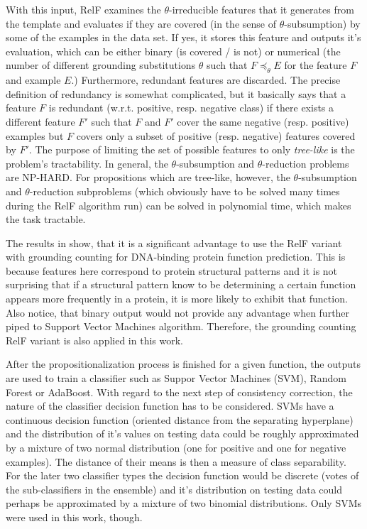 \documentclass[11pt,twoside,a4paper]{book}
\begin{document}
With this input, RelF examines the $\theta$-irreducible features that it generates from
the template and evaluates if they are covered (in the sense of $\theta$-subsumption)
by some of the examples in the data set.
If yes, it stores this feature and outputs it's evaluation,
which can be either binary (is covered / is not)
or numerical (the number of different grounding substitutions $\theta$ 
such that $F \preceq_{\theta} E$ for the feature $F$ and example $E$.)
Furthermore, redundant features are discarded.
The precise definition of redundancy \cite{relf} is somewhat complicated,
but it basically says that a feature $F$ is redundant (w.r.t. positive, resp. negative class)
if there exists a different feature $F'$ such that $F$ and $F'$ cover
the same negative (resp. positive) examples but $F$ covers only a subset
of positive (resp. negative) features covered by $F'$.
The purpose of limiting the set of possible features to only \emph{tree-like}
is the problem's tractability.
In general,
the $\theta$-subsumption and $\theta$-reduction problems are NP-HARD.
For propositions which are tree-like, however, the $\theta$-subsumption and $\theta$-reduction subproblems 
(which obviously have to be solved many times during the RelF algorithm run)
can be solved in polynomial time, which makes the task tractable.

The results in \cite{szabova} show,
that it is a significant advantage to use the RelF variant with grounding counting
for DNA-binding protein function prediction.
This is because features here correspond to protein structural patterns and
it is not surprising that if a structural pattern know to be determining a certain function
appears more frequently in a protein, it is more likely to exhibit that function.
Also notice, that binary output would not provide any advantage when further piped to Support Vector Machines algorithm.
Therefore, the grounding counting RelF variant is also applied in this work. 

After the propositionalization process is finished for a given function,
the outputs are used to train a classifier
such as Suppor Vector Machines (SVM), Random Forest or \mbox{AdaBoost}.
With regard to the next step of consistency correction,
the nature of the classifier decision function has to be considered.
SVMs have a continuous decision function
(oriented distance from the separating hyperplane)
and the distribution of it's values on testing data could be 
roughly approximated by a mixture of two normal distribution (one for positive and one for negative examples).
The distance of their means is then a measure of class separability.
For the later two classifier types the decision function
would be discrete (votes of the sub-classifiers in the ensemble)
and it's distribution on testing data could perhaps be approximated by a mixture of two binomial distributions.
Only SVMs were used in this work, though.
\end{document}
